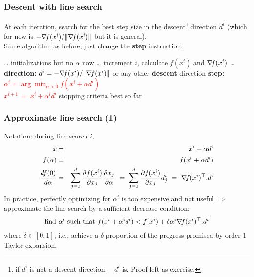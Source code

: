 \documentclass[12pt]{beamer}
\begin{document}
\begin{frame}
\frametitle{Descent with line search} 
\vspace{-0.5cm}
At each iteration, search for the best step size in the descent\footnote{if $d^i$ is not a descent direction, $-d^i$ is. Proof left as exercise.} direction $d^i$ (which for now is $-\nabla\!{f}(x^i)/\lVert \nabla\!{f}(x^i) \rVert$ but it is general).\\ 
Same algorithm as before, just change the \textbf{step} instruction:
\begin{block}{}
\begin{algorithmic}
\REQUIRE \ldots
\STATE initializations but no $\alpha$ now \ldots
\REPEAT
\STATE increment $i$, calculate $f(x^i)$ and $\nabla\!{f}(x^i)$ \ldots
\STATE \textbf{direction: } $d^i = - \nabla\!{f}(x^i) / \lVert \nabla\!{f}(x^i) \rVert$ or any other \textbf{descent} direction
\STATE \textbf{step: } \textcolor{red}{$\alpha^{i} = \arg \min_{\alpha > 0} f(x^i+\alpha d^i)$ \\
\hspace{1.5cm}$x^{i+1} ~=~ x^i + \alpha^i d^i$
} %
\UNTIL stopping criteria
\RETURN best so far
\end{algorithmic}
\end{block}
\end{frame}

\begin{frame}
\frametitle{Approximate line search (1)} 
Notation: during line search $i$, 
\begin{eqnarray*}
x &=& x^i + \alpha d^i \\
f(\alpha) &=& f(x^i + \alpha d^i) \\
\frac{df(0)}{d\alpha} &=& \sum_{j=1}^d \frac{\partial f(x^i)}{\partial x_j} \frac{\partial x_j}{\partial \alpha}
~=~\sum_{j=1}^d \frac{\partial f(x^i)}{\partial x_j} d^i_j
~=~ \nabla\!{f}(x^i)^\top . d^i
\end{eqnarray*}
In practice, perfectly optimizing for $\alpha^i$ is too expensive and not useful 
$\Rightarrow$ approximate the line search by a sufficient decrease condition:
\begin{equation*}
\text{find } \alpha^i \text{ such that } f(x^i + \alpha^i d^i) < f(x^i) + \delta \alpha^i \nabla\!{f}(x^i)^\top . d^i
\end{equation*}
where $\delta \in [0,1]$, i.e., achieve a $\delta$ proportion of the progress promised by order 1 Taylor expansion.
\end{frame}
\end{document}

